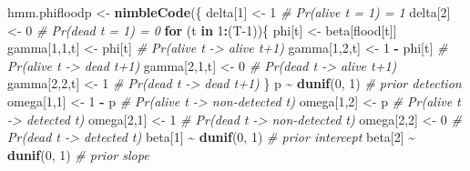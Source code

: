 \documentclass[
  12pt,
]{krantz}
\newenvironment{Shaded}{\begin{snugshade}}{\end{snugshade}}
\newcommand{\CommentTok}[1]{\textcolor[rgb]{0.56,0.35,0.01}{\textit{#1}}}
\newcommand{\ControlFlowTok}[1]{\textcolor[rgb]{0.13,0.29,0.53}{\textbf{#1}}}
\newcommand{\DecValTok}[1]{\textcolor[rgb]{0.00,0.00,0.81}{#1}}
\newcommand{\FunctionTok}[1]{\textcolor[rgb]{0.13,0.29,0.53}{\textbf{#1}}}
\newcommand{\NormalTok}[1]{#1}
\newcommand{\OtherTok}[1]{\textcolor[rgb]{0.56,0.35,0.01}{#1}}
\newcommand{\SpecialCharTok}[1]{\textcolor[rgb]{0.81,0.36,0.00}{\textbf{#1}}}
\begin{document}
\begin{Shaded}
\begin{Highlighting}[]
\NormalTok{hmm.phifloodp }\OtherTok{\textless{}{-}} \FunctionTok{nimbleCode}\NormalTok{(\{}
\NormalTok{  delta[}\DecValTok{1}\NormalTok{] }\OtherTok{\textless{}{-}} \DecValTok{1}          \CommentTok{\# Pr(alive t = 1) = 1}
\NormalTok{  delta[}\DecValTok{2}\NormalTok{] }\OtherTok{\textless{}{-}} \DecValTok{0}          \CommentTok{\# Pr(dead t = 1) = 0}
  \ControlFlowTok{for}\NormalTok{ (t }\ControlFlowTok{in} \DecValTok{1}\SpecialCharTok{:}\NormalTok{(T}\DecValTok{{-}1}\NormalTok{))\{}
\NormalTok{    phi[t] }\OtherTok{\textless{}{-}}\NormalTok{ beta[flood[t]]}
\NormalTok{    gamma[}\DecValTok{1}\NormalTok{,}\DecValTok{1}\NormalTok{,t] }\OtherTok{\textless{}{-}}\NormalTok{ phi[t]      }\CommentTok{\# Pr(alive t {-}\textgreater{} alive t+1)}
\NormalTok{    gamma[}\DecValTok{1}\NormalTok{,}\DecValTok{2}\NormalTok{,t] }\OtherTok{\textless{}{-}} \DecValTok{1} \SpecialCharTok{{-}}\NormalTok{ phi[t]  }\CommentTok{\# Pr(alive t {-}\textgreater{} dead t+1)}
\NormalTok{    gamma[}\DecValTok{2}\NormalTok{,}\DecValTok{1}\NormalTok{,t] }\OtherTok{\textless{}{-}} \DecValTok{0}        \CommentTok{\# Pr(dead t {-}\textgreater{} alive t+1)}
\NormalTok{    gamma[}\DecValTok{2}\NormalTok{,}\DecValTok{2}\NormalTok{,t] }\OtherTok{\textless{}{-}} \DecValTok{1}        \CommentTok{\# Pr(dead t {-}\textgreater{} dead t+1)}
\NormalTok{  \}}
\NormalTok{  p }\SpecialCharTok{\textasciitilde{}} \FunctionTok{dunif}\NormalTok{(}\DecValTok{0}\NormalTok{, }\DecValTok{1}\NormalTok{) }\CommentTok{\# prior detection}
\NormalTok{  omega[}\DecValTok{1}\NormalTok{,}\DecValTok{1}\NormalTok{] }\OtherTok{\textless{}{-}} \DecValTok{1} \SpecialCharTok{{-}}\NormalTok{ p    }\CommentTok{\# Pr(alive t {-}\textgreater{} non{-}detected t)}
\NormalTok{  omega[}\DecValTok{1}\NormalTok{,}\DecValTok{2}\NormalTok{] }\OtherTok{\textless{}{-}}\NormalTok{ p        }\CommentTok{\# Pr(alive t {-}\textgreater{} detected t)}
\NormalTok{  omega[}\DecValTok{2}\NormalTok{,}\DecValTok{1}\NormalTok{] }\OtherTok{\textless{}{-}} \DecValTok{1}        \CommentTok{\# Pr(dead t {-}\textgreater{} non{-}detected t)}
\NormalTok{  omega[}\DecValTok{2}\NormalTok{,}\DecValTok{2}\NormalTok{] }\OtherTok{\textless{}{-}} \DecValTok{0}        \CommentTok{\# Pr(dead t {-}\textgreater{} detected t)}
\NormalTok{  beta[}\DecValTok{1}\NormalTok{] }\SpecialCharTok{\textasciitilde{}} \FunctionTok{dunif}\NormalTok{(}\DecValTok{0}\NormalTok{, }\DecValTok{1}\NormalTok{) }\CommentTok{\# prior intercept}
\NormalTok{  beta[}\DecValTok{2}\NormalTok{] }\SpecialCharTok{\textasciitilde{}} \FunctionTok{dunif}\NormalTok{(}\DecValTok{0}\NormalTok{, }\DecValTok{1}\NormalTok{) }\CommentTok{\# prior slope}

\end{Highlighting}
\end{Shaded}
\end{document}
